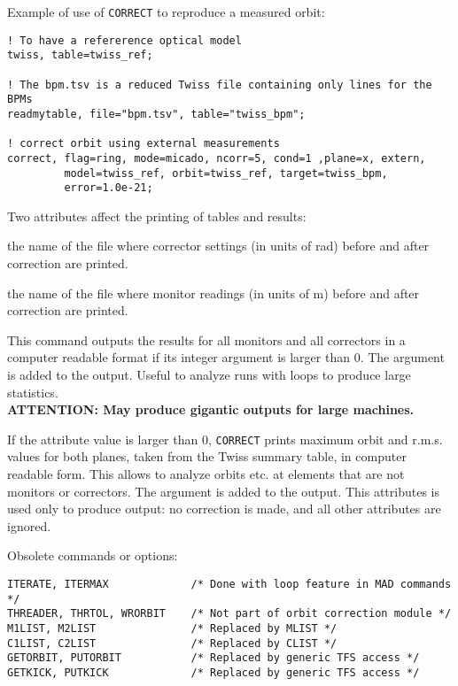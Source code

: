Example of use of {\tt CORRECT} to reproduce a measured orbit: 
\begin{verbatim}
! To have a refererence optical model
twiss, table=twiss_ref;

! The bpm.tsv is a reduced Twiss file containing only lines for the BPMs
readmytable, file="bpm.tsv", table="twiss_bpm";

! correct orbit using external measurements
correct, flag=ring, mode=micado, ncorr=5, cond=1 ,plane=x, extern,
         model=twiss_ref, orbit=twiss_ref, target=twiss_bpm, 
         error=1.0e-21;
\end{verbatim}


Two attributes affect the printing of tables and results: 
\begin{madlist}
    the name of the file where corrector settings (in units of rad)
     before and after correction are printed.

    the name of the file where monitor readings (in units of m) before
     and after correction are printed.

    This command outputs the results for all monitors and
     all correctors in a computer readable format if its integer
     argument is larger than 0. The argument is added to the
     output. Useful to analyze runs with loops to produce large
     statistics. \\
     \textbf{ATTENTION: May produce gigantic outputs for large
       machines.} 

    If the attribute value is larger than 0, {\tt CORRECT}
     prints maximum orbit and r.m.s. values for both planes, taken from the
     Twiss summary table, in computer readable form. This allows to analyze
     orbits etc. at elements that are not monitors or correctors. The
     argument is added to the output.  This attributes is used only to produce 
     output: no correction is made, and all other attributes are ignored.  
\end{madlist}

Obsolete commands or options:
\begin{verbatim}
ITERATE, ITERMAX             /* Done with loop feature in MAD commands */
THREADER, THRTOL, WRORBIT    /* Not part of orbit correction module */
M1LIST, M2LIST               /* Replaced by MLIST */
C1LIST, C2LIST               /* Replaced by CLIST */
GETORBIT, PUTORBIT           /* Replaced by generic TFS access */
GETKICK, PUTKICK             /* Replaced by generic TFS access */
\end{verbatim}

